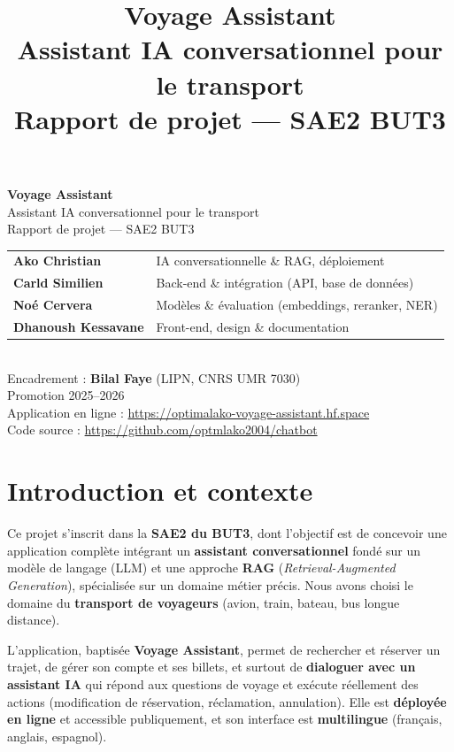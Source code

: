 \documentclass[11pt,a4paper]{article}
\title{\textbf{Voyage Assistant}\\[0.3cm]
\large Assistant IA conversationnel pour le transport\\
\normalsize Rapport de projet --- SAE2 BUT3}
\author{}
\date{}
\begin{document}
\begin{titlepage}
\centering
\vspace*{2cm}
{\Huge\bfseries Voyage Assistant}\\[0.5cm]
{\Large Assistant IA conversationnel pour le transport}\\[0.3cm]
{\large Rapport de projet --- SAE2 BUT3}\\[1.5cm]

\begin{tabular}{>{\bfseries}l l}
Ako Christian & IA conversationnelle \& RAG, déploiement \\[0.2cm]
Carld Similien & Back-end \& intégration (API, base de données) \\[0.2cm]
Noé Cervera & Modèles \& évaluation (embeddings, reranker, NER) \\[0.2cm]
Dhanoush Kessavane & Front-end, design \& documentation \\
\end{tabular}\\[1.5cm]

Encadrement : \textbf{Bilal Faye} (LIPN, CNRS UMR 7030)\\[0.3cm]
Promotion 2025--2026\\[2cm]

Application en ligne : \url{https://optimalako-voyage-assistant.hf.space}\\[0.2cm]
Code source : \url{https://github.com/optmlako2004/chatbot}

\vfill
\end{titlepage}

\tableofcontents
\newpage

\section{Introduction et contexte}

Ce projet s'inscrit dans la \textbf{SAE2 du BUT3}, dont l'objectif est de concevoir
une application complète intégrant un \textbf{assistant conversationnel} fondé sur un
modèle de langage (LLM) et une approche \textbf{RAG} (\emph{Retrieval-Augmented
Generation}), spécialisée sur un domaine métier précis. Nous avons choisi le domaine
du \textbf{transport de voyageurs} (avion, train, bateau, bus longue distance).

L'application, baptisée \textbf{Voyage Assistant}, permet de rechercher et réserver
un trajet, de gérer son compte et ses billets, et surtout de \textbf{dialoguer avec
un assistant IA} qui répond aux questions de voyage et exécute réellement des actions
(modification de réservation, réclamation, annulation). Elle est \textbf{déployée en
ligne} et accessible publiquement, et son interface est \textbf{multilingue}
(français, anglais, espagnol).
\end{document}
